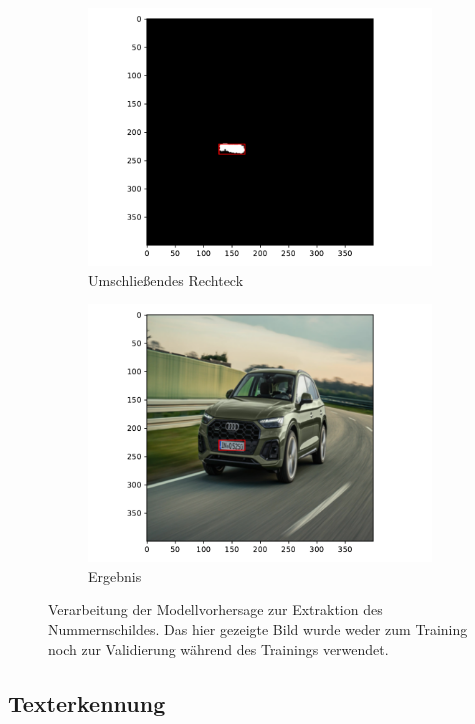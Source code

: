 \begin{figure}
\begin{subfigure}{0.495\textwidth}
        \includegraphics[width=\textwidth]{abbildungen/verarbeitung_3}
        \caption{Umschlie{\ss}endes Rechteck}
    \end{subfigure}
    \begin{subfigure}{0.495\textwidth}
        \centering
        \includegraphics[width=\textwidth]{abbildungen/verarbeitung_4}
        \caption{Ergebnis}
    \end{subfigure}
    \caption{Verarbeitung der Modellvorhersage zur Extraktion des
        Nummernschildes. Das hier gezeigte Bild wurde weder zum Training
        noch zur Validierung w\"ahrend des Trainings verwendet.}
\end{figure}

\subsection{Texterkennung}
\label{sec:texterkennung}